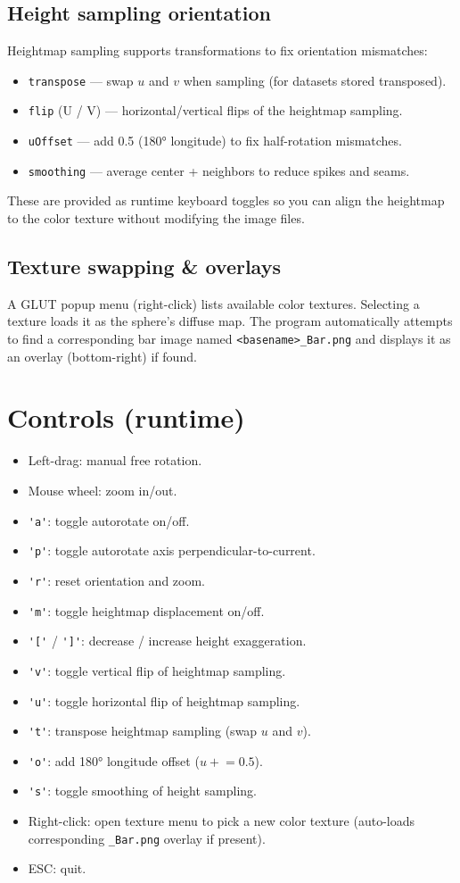 \documentclass[11pt]{article}
\begin{document}
\subsection*{Height sampling orientation}
Heightmap sampling supports transformations to fix orientation mismatches:
\begin{itemize}
  \item \texttt{transpose} — swap \(u\) and \(v\) when sampling (for datasets stored transposed).
  \item \texttt{flip} (U / V) — horizontal/vertical flips of the heightmap sampling.
  \item \texttt{uOffset} — add 0.5 (180° longitude) to fix half-rotation mismatches.
  \item \texttt{smoothing} — average center + neighbors to reduce spikes and seams.
\end{itemize}
These are provided as runtime keyboard toggles so you can align the heightmap to the color texture without modifying the image files.

\subsection*{Texture swapping \& overlays}
A GLUT popup menu (right-click) lists available color textures. Selecting a texture loads it as the sphere's diffuse map. The program automatically attempts to find a corresponding bar image named \verb|<basename>_Bar.png| and displays it as an overlay (bottom-right) if found.

\section{Controls (runtime)}
\begin{itemize}
  \item Left-drag: manual free rotation.
  \item Mouse wheel: zoom in/out.
  \item \verb|'a'|: toggle autorotate on/off.
  \item \verb|'p'|: toggle autorotate axis perpendicular-to-current.
  \item \verb|'r'|: reset orientation and zoom.
  \item \verb|'m'|: toggle heightmap displacement on/off.
  \item \verb|'['| / \verb|']'|: decrease / increase height exaggeration.
  \item \verb|'v'|: toggle vertical flip of heightmap sampling.
  \item \verb|'u'|: toggle horizontal flip of heightmap sampling.
  \item \verb|'t'|: transpose heightmap sampling (swap \(u\) and \(v\)).
  \item \verb|'o'|: add 180° longitude offset (\(u \mathrel{+}= 0.5\)).
  \item \verb|'s'|: toggle smoothing of height sampling.
  \item Right-click: open texture menu to pick a new color texture (auto-loads corresponding \verb|_Bar.png| overlay if present).
  \item ESC: quit.
\end{itemize}
\end{document}
